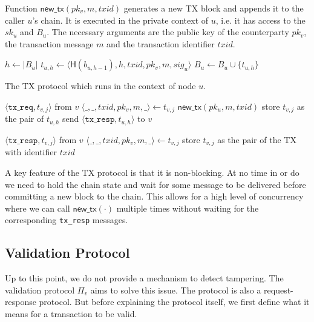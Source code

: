 \begin{algorithm}
    \caption{Function $\textsf{new\_tx}(pk_v, m, txid)$ generates a new TX block and appends it to the caller $u$'s chain.
    It is executed in the private context of $u$, i.e. it has access to the $sk_u$ and $B_u$.
    The necessary arguments are the public key of the counterparty $pk_v$, the transaction message $m$ and the transaction identifier $txid$.}
    \label{alg:new-tx}

    \begin{algorithmic}
    \State $h \gets |B_u|$
    \State $t_{u, h} \gets \langle \textsf{H}(b_{u, h - 1}), h, txid, pk_v, m, sig_u \rangle$
    \State $B_u \gets B_u \cup \{ t_{u, h} \}$
    \end{algorithmic}
\end{algorithm}

\begin{algorithm}
    \caption{The TX protocol which runs in the context of node $u$.}
    \label{alg:tx-proto}

    \begin{algorithmic}
        \Upon $\langle \texttt{tx\_req}, t_{v, j} \rangle$ from $v$
        \State $\langle \_, \_, txid, pk_v, m, \_ \rangle \gets t_{v, j}$
        \State $\textsf{new\_tx}(pk_u, m, txid)$
        \State store $t_{v, j}$ as the pair of $t_{u, h}$
        \State send $\langle \texttt{tx\_resp}, t_{u, h} \rangle$ to $v$

        \Upon $\langle \texttt{tx\_resp}, t_{v, j} \rangle$ from $v$
        \State $\langle \_, \_, txid, pk_v, m, \_ \rangle \gets t_{v, j}$
        \State store $t_{v, j}$ as the pair of the TX with identifier $txid$
    \end{algorithmic}
\end{algorithm}

A key feature of the TX protocol is that it is non-blocking.
At no time in  or  do we need to hold the chain state and wait for some message to be delivered before committing a new block to the chain.
This allows for a high level of concurrency where we can call $\textsf{new\_tx}(\cdot)$ multiple times without waiting for the corresponding \texttt{tx\_resp} messages.

\subsection{Validation Protocol}
\label{sec:vd-protocol}

Up to this point, we do not provide a mechanism to detect tampering.
The validation protocol $\Pi_v$ aims to solve this issue.
The protocol is also a request-response protocol.
But before explaining the protocol itself, we first define what it means for a transaction to be valid.

